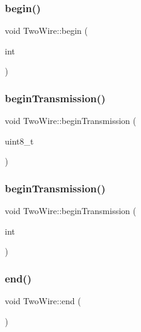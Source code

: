 \subsubsection{\texorpdfstring{begin()}{begin()}\hspace{0.1cm}{\footnotesize\ttfamily [3/3]}}
{\footnotesize\ttfamily void Two\+Wire\+::begin (\begin{DoxyParamCaption}\item[{int}]{ }\end{DoxyParamCaption})}

\mbox{\label{class_two_wire_a8d55f00ea8ac3d7427d62e0c71e95ec2}} 
\subsubsection{\texorpdfstring{begin\+Transmission()}{beginTransmission()}\hspace{0.1cm}{\footnotesize\ttfamily [1/2]}}
{\footnotesize\ttfamily void Two\+Wire\+::begin\+Transmission (\begin{DoxyParamCaption}\item[{uint8\+\_\+t}]{ }\end{DoxyParamCaption})}

\mbox{\label{class_two_wire_a4da95eb4adced5dad152344243e57aad}} 
\subsubsection{\texorpdfstring{begin\+Transmission()}{beginTransmission()}\hspace{0.1cm}{\footnotesize\ttfamily [2/2]}}
{\footnotesize\ttfamily void Two\+Wire\+::begin\+Transmission (\begin{DoxyParamCaption}\item[{int}]{ }\end{DoxyParamCaption})}

\mbox{\label{class_two_wire_a13cca813f6dd0201ac70178b18ba0946}} 
\subsubsection{\texorpdfstring{end()}{end()}}
{\footnotesize\ttfamily void Two\+Wire\+::end (\begin{DoxyParamCaption}{ }\end{DoxyParamCaption})}

